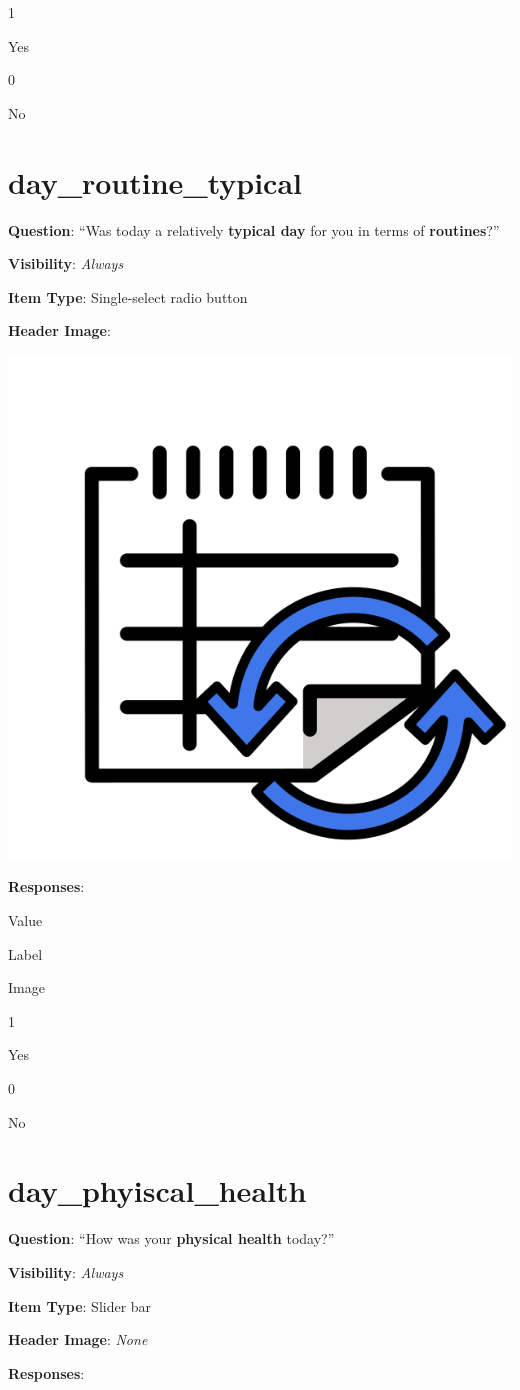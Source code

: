 \documentclass[]{book}
\begin{document}
1

Yes

0

No

\hypertarget{day_routine_typical}{%
\section{day\_routine\_typical}\label{day_routine_typical}}

\textbf{Question}: ``Was today a relatively \textbf{typical day} for you in terms of \textbf{routines}?''

\textbf{Visibility}: \emph{Always}

\textbf{Item Type}: Single-select radio button

\textbf{Header Image}:

\begin{flushleft}\includegraphics[width=0.33\linewidth]{downloadFigs4latex_NIMH_Applet_Codebook/day_routine_typical_headerImg} \end{flushleft}

\textbf{Responses}:

Value

Label

Image

1

Yes

0

No

\hypertarget{day_phyiscal_health}{%
\section{day\_phyiscal\_health}\label{day_phyiscal_health}}

\textbf{Question}: ``How was your \textbf{physical health} today?''

\textbf{Visibility}: \emph{Always}

\textbf{Item Type}: Slider bar

\textbf{Header Image}: \emph{None}

\textbf{Responses}:
\end{document}
